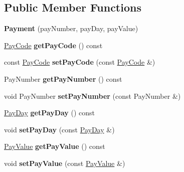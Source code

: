 \subsection*{Public Member Functions}
\begin{DoxyCompactItemize}
\item 
\hypertarget{classPayment_a8a58b96b0564db3a45dc69f7379caa40}{{\bfseries Payment} (pay\-Number, pay\-Day, pay\-Value)}\label{classPayment_a8a58b96b0564db3a45dc69f7379caa40}

\item 
\hypertarget{classPayment_a1d71998fa33e757bb350eb40895865ae}{\hyperlink{classPayCode}{Pay\-Code} {\bfseries get\-Pay\-Code} () const }\label{classPayment_a1d71998fa33e757bb350eb40895865ae}

\item 
\hypertarget{classPayment_adf458db6331e53948a473a04a0d622a4}{const \hyperlink{classPayCode}{Pay\-Code} {\bfseries set\-Pay\-Code} (const \hyperlink{classPayCode}{Pay\-Code} \&)}\label{classPayment_adf458db6331e53948a473a04a0d622a4}

\item 
\hypertarget{classPayment_aedc3924ab4e9db65b672c329d0e2f88b}{Pay\-Number {\bfseries get\-Pay\-Number} () const }\label{classPayment_aedc3924ab4e9db65b672c329d0e2f88b}

\item 
\hypertarget{classPayment_a895c7d62b503c7b27e3a2e527496f3d1}{void Pay\-Number {\bfseries set\-Pay\-Number} (const Pay\-Number \&)}\label{classPayment_a895c7d62b503c7b27e3a2e527496f3d1}

\item 
\hypertarget{classPayment_a22ee22d04f3f5757f115386aa3337c51}{\hyperlink{classPayDay}{Pay\-Day} {\bfseries get\-Pay\-Day} () const }\label{classPayment_a22ee22d04f3f5757f115386aa3337c51}

\item 
\hypertarget{classPayment_aaadd94e11ab24629d536809da691efc5}{void {\bfseries set\-Pay\-Day} (const \hyperlink{classPayDay}{Pay\-Day} \&)}\label{classPayment_aaadd94e11ab24629d536809da691efc5}

\item 
\hypertarget{classPayment_a2d5883b07cbcd31e54972c559b4a70fc}{\hyperlink{classPayValue}{Pay\-Value} {\bfseries get\-Pay\-Value} () const }\label{classPayment_a2d5883b07cbcd31e54972c559b4a70fc}

\item 
\hypertarget{classPayment_a563cd47a5839865b9eadc8cc9e0da1b7}{void {\bfseries set\-Pay\-Value} (const \hyperlink{classPayValue}{Pay\-Value} \&)}\label{classPayment_a563cd47a5839865b9eadc8cc9e0da1b7}

\end{DoxyCompactItemize}

